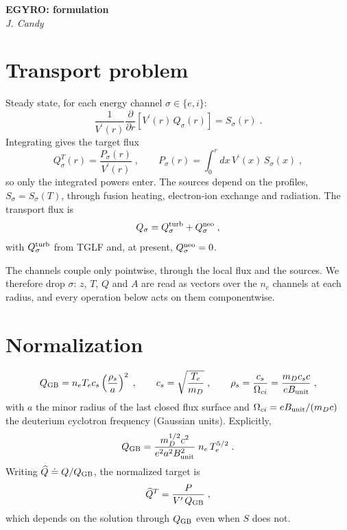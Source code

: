 \documentclass[12pt]{article}
\newcommand\qgb{Q_{\rm GB}}
\newcommand\vpr{V^\prime}
\newcommand\qhat{\widehat{Q}}
\begin{document}
\begin{center}
{\bf EGYRO: formulation}\\
{\sl J. Candy}
\end{center}

\section{Transport problem}

Steady state, for each energy channel $\sigma \in \{e,i\}$:
%
\begin{equation}
\frac{1}{\vpr(r)} \frac{\partial}{\partial r}
 \left[ \vpr(r) \, Q_\sigma(r) \right] = S_\sigma(r) \; .
\label{eq.transport}
\end{equation}
%
Integrating gives the target flux
%
\begin{equation}
Q^T_\sigma(r) = \frac{P_\sigma(r)}{\vpr(r)} \; ,
\qquad
P_\sigma(r) = \int_0^r dx \, \vpr(x) \, S_\sigma(x) \; ,
\label{eq.target}
\end{equation}
%
so only the integrated powers enter.  The sources depend on the
profiles, $S_\sigma = S_\sigma(T)$, through fusion heating,
electron-ion exchange and radiation.  The transport flux is
%
\begin{equation}
Q_\sigma = Q_\sigma^{\rm turb} + Q_\sigma^{\rm neo} \; ,
\end{equation}
%
with $Q^{\rm turb}_\sigma$ from TGLF and, at present,
$Q^{\rm neo}_\sigma = 0$.

The channels couple only pointwise, through the local flux and the
sources.  We therefore drop $\sigma$: $z$, $T$, $Q$ and $A$ are read as
vectors over the $n_c$ channels at each radius, and every operation
below acts on them componentwise.

\section{Normalization}

\begin{equation}
\qgb = n_e T_e c_s \left( \frac{\rho_s}{a} \right)^{2} \; ,
\qquad
c_s = \sqrt{\frac{T_e}{m_D}} \; ,
\qquad
\rho_s = \frac{c_s}{\Omega_{ci}} = \frac{m_D c_s c}{e B_{\rm unit}} \; ,
\end{equation}
%
with $a$ the minor radius of the last closed flux surface and $\Omega_{ci}
= e B_{\rm unit}/(m_D c)$ the deuterium cyclotron frequency (Gaussian
units).  Explicitly,
%
\begin{equation}
\qgb = \frac{m_D^{1/2} c^2}{e^2 a^2 B_{\rm unit}^2} \; n_e \, T_e^{5/2} \; .
\label{eq.qgb}
\end{equation}
%
Writing $\qhat \doteq Q/\qgb$, the normalized target is
%
\begin{equation}
\qhat^T = \frac{P}{\vpr \, \qgb} \; ,
\label{eq.qhattarget}
\end{equation}
%
which depends on the solution through $\qgb$ even when $S$ does not.
\end{document}
